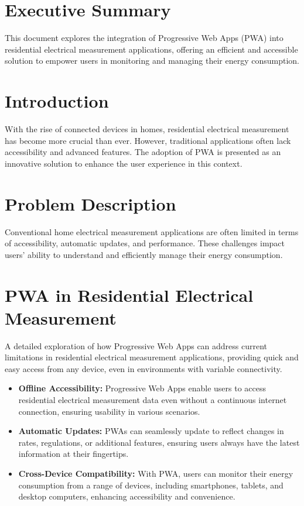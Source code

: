 \documentclass{article}
\begin{document}
\begin{multicols}{2}  %

\section*{Executive Summary}
This document explores the integration of Progressive Web Apps (PWA) into residential electrical measurement applications, offering an efficient and accessible solution to empower users in monitoring and managing their energy consumption.

\section*{Introduction}
With the rise of connected devices in homes, residential electrical measurement has become more crucial than ever. However, traditional applications often lack accessibility and advanced features. The adoption of PWA is presented as an innovative solution to enhance the user experience in this context.

\section*{Problem Description}
Conventional home electrical measurement applications are often limited in terms of accessibility, automatic updates, and performance. These challenges impact users' ability to understand and efficiently manage their energy consumption.

\section*{PWA in Residential Electrical Measurement}
A detailed exploration of how Progressive Web Apps can address current limitations in residential electrical measurement applications, providing quick and easy access from any device, even in environments with variable connectivity.

\begin{itemize}
    \item \textbf{Offline Accessibility:} Progressive Web Apps enable users to access residential electrical measurement data even without a continuous internet connection, ensuring usability in various scenarios.
    \item \textbf{Automatic Updates:} PWAs can seamlessly update to reflect changes in rates, regulations, or additional features, ensuring users always have the latest information at their fingertips.
    \item \textbf{Cross-Device Compatibility:} With PWA, users can monitor their energy consumption from a range of devices, including smartphones, tablets, and desktop computers, enhancing accessibility and convenience.
\end{itemize}


\end{multicols}
\end{document}
